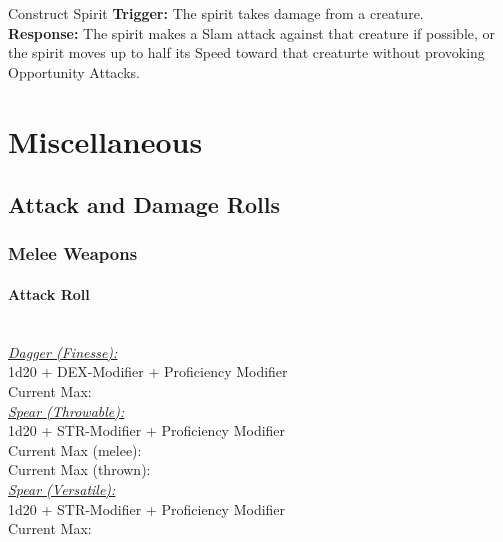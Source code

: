 \documentclass[letterpaper,openany,oneside,twocolumn]{book}
\begin{document}
\begin{DndMonster}[width=0.5\textwidth]{Construct Spirit}
	\textbf{Trigger:} The spirit takes damage from a creature.\\
	\textbf{Response:} The spirit makes a Slam attack against that creature if possible, or the spirit moves up to half its Speed toward that creaturte without provoking Opportunity Attacks.	
\end{DndMonster}
  
\vfill\eject
\section*{Miscellaneous}
\subsection*{Attack and Damage Rolls}
\subsubsection*{Melee Weapons}
\paragraph*{Attack Roll}\hfill\\
\underline{\textit{Dagger (Finesse):}}\\
1d20 + DEX-Modifier + Proficiency Modifier\\
\indent Current Max: 
\\
\underline{\textit{Spear (Throwable):}}\\
1d20 + STR-Modifier + Proficiency Modifier\\
\indent Current Max (melee): \\
\indent Current Max (thrown): 
\\
\underline{\textit{Spear (Versatile):}}\\
1d20 + STR-Modifier + Proficiency Modifier\\
\indent Current Max: 
\end{document}
